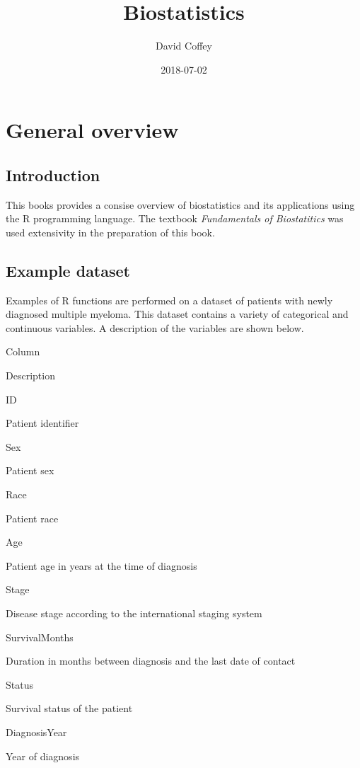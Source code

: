 \documentclass[]{book}
\title{Biostatistics}
\author{David Coffey}
\date{2018-07-02}
\theoremstyle{definition}
\theoremstyle{definition}
\theoremstyle{definition}
\theoremstyle{remark}
\begin{document}
\maketitle

{
\setcounter{tocdepth}{1}
\tableofcontents
}
\chapter{General overview}\label{general-overview}

\section{Introduction}\label{introduction}

This books provides a consise overview of biostatistics and its
applications using the R programming language. The textbook
\emph{Fundamentals of Biostatitics} \citep{Rosner2016} was used
extensivity in the preparation of this book.

\section{Example dataset}\label{example-dataset}

Examples of R functions are performed on a dataset of patients with
newly diagnosed multiple myeloma. This dataset contains a variety of
categorical and continuous variables. A description of the variables are
shown below.

Column

Description

ID

Patient identifier

Sex

Patient sex

Race

Patient race

Age

Patient age in years at the time of diagnosis

Stage

Disease stage according to the international staging system

SurvivalMonths

Duration in months between diagnosis and the last date of contact

Status

Survival status of the patient

DiagnosisYear

Year of diagnosis
\end{document}
